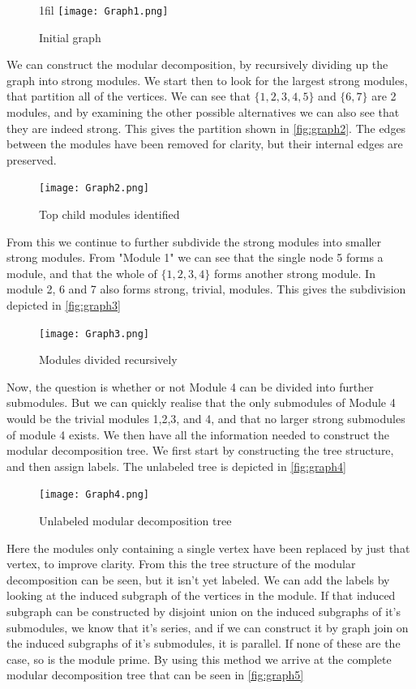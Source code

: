 \documentclass[a4paper]{article}
\makeatletter
\newcommand*{\centerfloat}{%
  \parindent \z@
  \leftskip \z@ \@plus 1fil \@minus \textwidth
  \rightskip\leftskip
  \parfillskip \z@skip}
\makeatother
\begin{document}
\begin{figure}[H]
    \centerfloat
    \texttt{[image: Graph1.png]}
    \caption{Initial graph}
    \label{fig:graph1}
\end{figure}

We can construct the modular decomposition, by recursively dividing up the graph
into strong modules. We start then to look for the largest strong modules, that
partition all of the vertices. We can see that $\{1,2,3,4,5\}$ and $\{6,7\}$
are 2 modules, and by examining the other possible alternatives we can also
see that they are indeed strong. This gives the partition shown in 
\autoref{fig:graph2}. The edges between the modules have been removed for
clarity, but their internal edges are preserved.

\begin{figure}[H]
    \texttt{[image: Graph2.png]}
    \caption{Top child modules identified}
    \label{fig:graph2}
\end{figure}

From this we continue to further subdivide the strong modules into smaller
strong modules. From "Module 1" we can see that the single node 5 forms a
module, and that the whole of $\{1,2,3,4\}$ forms another strong module.
In module 2, 6 and 7 also forms strong, trivial, modules. This gives the
subdivision depicted in \autoref{fig:graph3}

\begin{figure}[H]
    \texttt{[image: Graph3.png]}
    \caption{Modules divided recursively}
    \label{fig:graph3}
\end{figure}

Now, the question is whether or not Module 4 can be divided into further
submodules. But we can quickly realise that the only submodules of Module 4
would be the trivial modules 1,2,3, and 4, and that no larger strong submodules
of module 4 exists. We then have all the information needed to construct the
modular decomposition tree. We first start by constructing the tree structure,
and then assign labels. The unlabeled tree is depicted in \autoref{fig:graph4}

\begin{figure}[H]
    \texttt{[image: Graph4.png]}
    \caption{Unlabeled modular decomposition tree}
    \label{fig:graph4}
\end{figure}

Here the modules only containing a single vertex have been replaced by just that
vertex, to improve clarity. From this the tree structure of the modular
decomposition can be seen, but it isn't yet labeled. We can add the labels by 
looking at the induced subgraph of the vertices in the module. If that induced
subgraph can be constructed by disjoint union on the induced subgraphs of it's
submodules, we know that it's series, and if we can construct it by graph join on
the induced subgraphs of it's submodules, it is parallel. If none of these are
the case, so is the module prime. By using this method we arrive at the complete
modular decomposition tree that can be seen in \autoref{fig:graph5}
\end{document}
